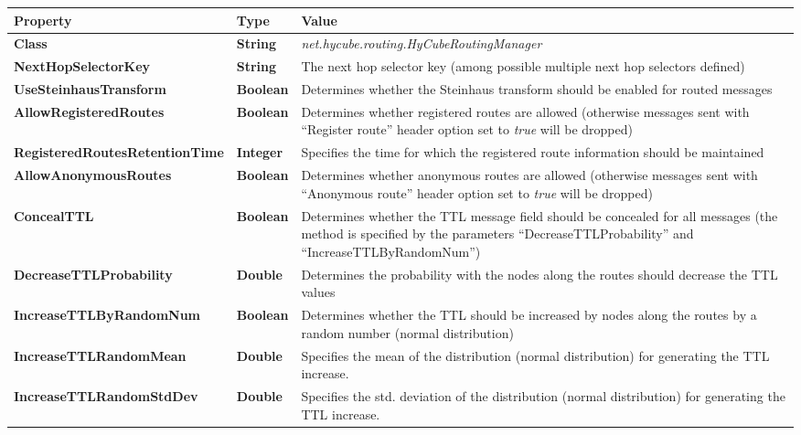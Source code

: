 \begin{table}
\scriptsize
\begin{center}
\begin{tabular}{p{5cm} p{1.5cm} p{8cm}}
	\hline
	\textbf{Property}						& \textbf{Type}					& \textbf{Value}					\\[1mm]
    \hline
	\textbf{Class}							& \textbf{String}				& \textit{net.hycube.routing.HyCubeRoutingManager}										\\[1.5mm]	
    \textbf{NextHopSelectorKey}				& \textbf{String}				& The next hop selector key (among possible multiple next hop selectors defined)		\\[1.5mm]
	\textbf{UseSteinhausTransform}			& \textbf{Boolean}				& Determines whether the Steinhaus transform should be enabled for routed messages				\\[1.5mm]
	\textbf{AllowRegisteredRoutes}			& \textbf{Boolean}				& Determines whether registered routes are allowed (otherwise messages sent with ``Register route'' header option set to \emph{true} will be dropped)		\\[1.5mm]
	\textbf{RegisteredRoutesRetentionTime}	& \textbf{Integer}				& Specifies the time for which the registered route information should be maintained			\\[1.5mm]
	\textbf{AllowAnonymousRoutes}			& \textbf{Boolean}				& Determines whether anonymous routes are allowed (otherwise messages sent with ``Anonymous route'' header option set to \emph{true} will be dropped)		\\[1.5mm]
	\textbf{ConcealTTL}						& \textbf{Boolean}				& Determines whether the TTL message field should be concealed for all messages (the method is specified by the parameters ``DecreaseTTLProbability'' and ``IncreaseTTLByRandomNum'')			\\[1.5mm]
	\textbf{DecreaseTTLProbability}			& \textbf{Double}				& Determines the probability with the nodes along the routes should decrease the TTL values		\\[1.5mm]
	\textbf{IncreaseTTLByRandomNum}			& \textbf{Boolean}				& Determines whether the TTL should be increased by nodes along the routes by a random number (normal distribution)		\\[1.5mm]
	\textbf{IncreaseTTLRandomMean}			& \textbf{Double}				& Specifies the mean of the distribution (normal distribution) for generating the TTL increase.		\\[1.5mm]
	\textbf{IncreaseTTLRandomStdDev}		& \textbf{Double}				& Specifies the std. deviation of the distribution (normal distribution) for generating the TTL increase.		\\[1.5mm]

\end{tabular}
\end{center}
\end{table}
